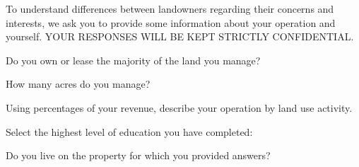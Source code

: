 \documentclass[
  english,
  ]{sdapsclassic}
\begin{document}
\begin{questionnaire}
  To understand differences between landowners regarding their concerns and interests, we ask you to provide some information about your operation and yourself. YOUR RESPONSES WILL BE KEPT STRICTLY CONFIDENTIAL.
    

    \begin{choicequestion}[cols=2]{Do you own or lease the majority of the land you manage?}
    \end{choicequestion}

    \begin{choicequestion}{How many acres do you manage?}
    \end{choicequestion}      
    
    \begin{choicequestion}{Using percentages of your revenue, describe your operation by land use activity.}
    \end{choicequestion}     

    
    
    \begin{choicequestion}[cols=6]{Select the highest level of education you have completed:}
    \end{choicequestion}     
    
    
    \begin{choicequestion}[cols=3]{Do you live on the property for which you provided answers?}
    \end{choicequestion}
    

\end{questionnaire}
\end{document}
